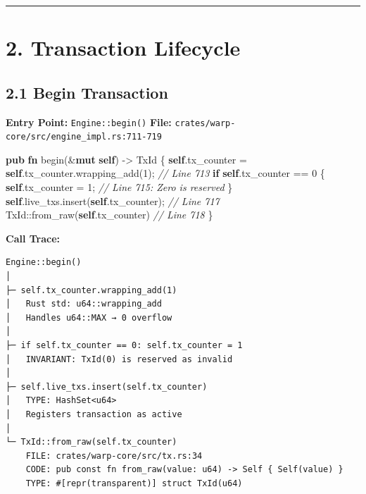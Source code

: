 \documentclass[
]{book}
\newenvironment{Shaded}{}{}
\newcommand{\CommentTok}[1]{\textcolor[rgb]{0.38,0.63,0.69}{\textit{#1}}}
\newcommand{\ControlFlowTok}[1]{\textcolor[rgb]{0.00,0.44,0.13}{\textbf{#1}}}
\newcommand{\DecValTok}[1]{\textcolor[rgb]{0.25,0.63,0.44}{#1}}
\newcommand{\KeywordTok}[1]{\textcolor[rgb]{0.00,0.44,0.13}{\textbf{#1}}}
\newcommand{\NormalTok}[1]{#1}
\newcommand{\OperatorTok}[1]{\textcolor[rgb]{0.40,0.40,0.40}{#1}}
\newcommand{\PreprocessorTok}[1]{\textcolor[rgb]{0.74,0.48,0.00}{#1}}
\begin{document}
\begin{center}\rule{0.5\linewidth}{0.5pt}\end{center}

\section{2. Transaction Lifecycle}\label{transaction-lifecycle}

\subsection{2.1 Begin Transaction}\label{begin-transaction}

\textbf{Entry Point:} \texttt{Engine::begin()} \textbf{File:}
\texttt{crates/warp-core/src/engine\_impl.rs:711-719}

\begin{Shaded}
\begin{Highlighting}[]
\KeywordTok{pub} \KeywordTok{fn}\NormalTok{ begin(}\OperatorTok{\&}\KeywordTok{mut} \KeywordTok{self}\NormalTok{) }\OperatorTok{{-}\textgreater{}}\NormalTok{ TxId }\OperatorTok{\{}
    \KeywordTok{self}\OperatorTok{.}\NormalTok{tx\_counter }\OperatorTok{=} \KeywordTok{self}\OperatorTok{.}\NormalTok{tx\_counter}\OperatorTok{.}\NormalTok{wrapping\_add(}\DecValTok{1}\NormalTok{)}\OperatorTok{;}  \CommentTok{// Line 713}
    \ControlFlowTok{if} \KeywordTok{self}\OperatorTok{.}\NormalTok{tx\_counter }\OperatorTok{==} \DecValTok{0} \OperatorTok{\{}
        \KeywordTok{self}\OperatorTok{.}\NormalTok{tx\_counter }\OperatorTok{=} \DecValTok{1}\OperatorTok{;}                            \CommentTok{// Line 715: Zero is reserved}
    \OperatorTok{\}}
    \KeywordTok{self}\OperatorTok{.}\NormalTok{live\_txs}\OperatorTok{.}\NormalTok{insert(}\KeywordTok{self}\OperatorTok{.}\NormalTok{tx\_counter)}\OperatorTok{;}              \CommentTok{// Line 717}
    \PreprocessorTok{TxId::}\NormalTok{from\_raw(}\KeywordTok{self}\OperatorTok{.}\NormalTok{tx\_counter)                     }\CommentTok{// Line 718}
\OperatorTok{\}}
\end{Highlighting}
\end{Shaded}

\textbf{Call Trace:}

\begin{verbatim}
Engine::begin()
│
├─ self.tx_counter.wrapping_add(1)
│   Rust std: u64::wrapping_add
│   Handles u64::MAX → 0 overflow
│
├─ if self.tx_counter == 0: self.tx_counter = 1
│   INVARIANT: TxId(0) is reserved as invalid
│
├─ self.live_txs.insert(self.tx_counter)
│   TYPE: HashSet<u64>
│   Registers transaction as active
│
└─ TxId::from_raw(self.tx_counter)
    FILE: crates/warp-core/src/tx.rs:34
    CODE: pub const fn from_raw(value: u64) -> Self { Self(value) }
    TYPE: #[repr(transparent)] struct TxId(u64)
\end{verbatim}
\end{document}
